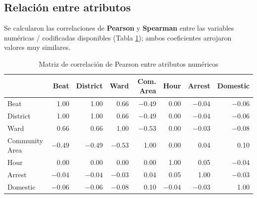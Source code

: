\documentclass[11pt,a4paper]{article}
\begin{document}
\subsection{Relación entre atributos}

Se calcularon las correlaciones de \textbf{Pearson} y \textbf{Spearman}
entre las variables numéricas / codificadas disponibles (Tabla
\ref{tab:correlacion}); ambos coeficientes arrojaron valores muy similares.

\begin{table}[H]
\centering
\caption{Matriz de correlación de Pearson entre atributos numéricos}
\label{tab:correlacion}
\small
\begin{tabular}{lrrrrrrr}
\toprule
 & Beat & District & Ward & Com. Area & Hour & Arrest & Domestic\\
\midrule
Beat & 1.00 & 1.00 & 0.66 & $-0.49$ & 0.00 & $-0.04$ & $-0.06$\\
District & 1.00 & 1.00 & 0.66 & $-0.49$ & 0.00 & $-0.04$ & $-0.06$\\
Ward & 0.66 & 0.66 & 1.00 & $-0.53$ & 0.00 & $-0.03$ & $-0.08$\\
Community Area & $-0.49$ & $-0.49$ & $-0.53$ & 1.00 & 0.00 & 0.04 & 0.10\\
Hour & 0.00 & 0.00 & 0.00 & 0.00 & 1.00 & 0.05 & $-0.04$\\
Arrest & $-0.04$ & $-0.04$ & $-0.03$ & 0.04 & 0.05 & 1.00 & $-0.03$\\
Domestic & $-0.06$ & $-0.06$ & $-0.08$ & 0.10 & $-0.04$ & $-0.03$ & 1.00\\
\bottomrule
\end{tabular}
\end{table}
\end{document}
